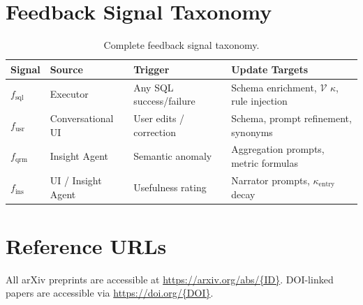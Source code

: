 \documentclass[11pt,a4paper]{article}
\begin{document}
\section{Feedback Signal Taxonomy}\label{app:feedback}

\begin{table}[H]
\centering
\caption{Complete feedback signal taxonomy.}
\small
\begin{tabular}{llll}
\toprule
\textbf{Signal} & \textbf{Source} & \textbf{Trigger} & \textbf{Update Targets} \\
\midrule
$f_\mathrm{sql}$ & Executor & Any SQL success/failure & Schema enrichment, $\mathcal{V}$ $\kappa$, rule injection \\
$f_\mathrm{usr}$ & Conversational UI & User edits / correction & Schema, prompt refinement, synonyms \\
$f_\mathrm{qrm}$ & Insight Agent & Semantic anomaly & Aggregation prompts, metric formulas \\
$f_\mathrm{ins}$ & UI / Insight Agent & Usefulness rating & Narrator prompts, $\kappa_\mathrm{entry}$ decay \\
\bottomrule
\end{tabular}
\end{table}

\section{Reference URLs}\label{app:urls}

All arXiv preprints are accessible at \url{https://arxiv.org/abs/\{ID\}}.
DOI-linked papers are accessible via \url{https://doi.org/\{DOI\}}.
\end{document}

